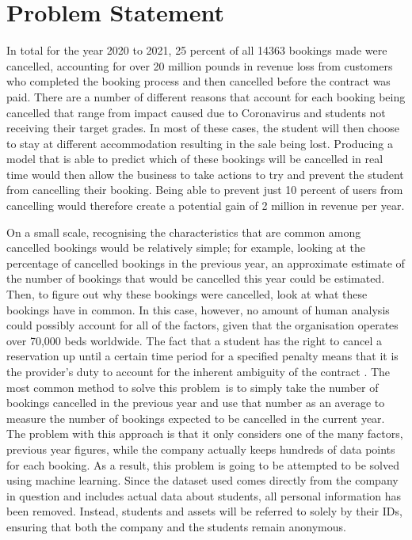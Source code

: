 \section{Problem Statement}

In total for the year 2020 to 2021, 25 percent of all 14363 bookings made were cancelled, accounting for over 20 million pounds in revenue loss from customers who completed the booking process and then cancelled before the contract was paid. There are a number of different reasons that account for each booking being cancelled that range from impact caused due to Coronavirus and students not receiving their target grades. In most of these cases, the student will then choose to stay at different accommodation resulting in the sale being lost. Producing a model that is able to predict which of these bookings will be cancelled in real time would then allow the business to take actions to try and prevent the student from cancelling their booking. Being able to prevent just 10 percent of users from cancelling would therefore create a potential gain of 2 million in revenue per year.  

\vspace{5mm}

On a small scale, recognising the characteristics that are common among cancelled bookings would be relatively simple; for example, looking at the percentage of cancelled bookings in the previous year, an approximate estimate of the number of bookings that would be cancelled this year could be estimated. Then, to figure out why these bookings were cancelled, look at what these bookings have in common. In this case, however, no amount of human analysis could possibly account for all of the factors, given that the organisation operates over 70,000 beds worldwide. The fact that a student has the right to cancel a reservation up until a certain time period for a specified penalty means that it is the provider's duty to account for the inherent ambiguity of the contract . The most common method to solve this problem is to simply take the number of bookings cancelled in the previous year and use that number as an average to measure the number of bookings expected to be cancelled in the current year. The problem with this approach is that it only considers one of the many factors, previous year figures, while the company actually keeps hundreds of data points for each booking. As a result, this problem is going to be attempted to be solved using  machine learning. Since the dataset used comes directly from the company in question and includes actual data about students, all personal information has been removed. Instead, students and assets will be referred to solely by their IDs, ensuring that both the company and the students remain anonymous.
    
